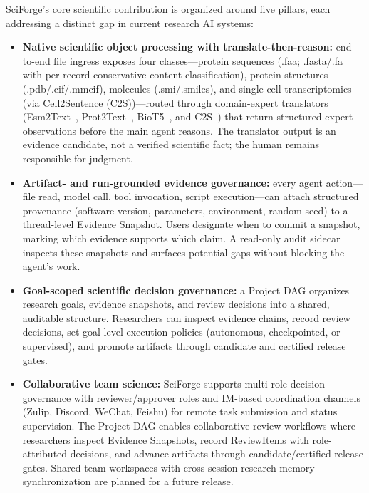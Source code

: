 \documentclass[sn-basic,Numbered,pdflatex]{sn-jnl}
\begin{document}
SciForge's core scientific contribution is organized around five pillars, each addressing a distinct gap in current research AI systems:
\begin{itemize}
    \item \textbf{Native scientific object processing with translate-then-reason:} end-to-end file ingress exposes four classes---protein sequences (.faa; .fasta/.fa with per-record conservative content classification), protein structures (.pdb/.cif/.mmcif), molecules (.smi/.smiles), and single-cell transcriptomics (via Cell2Sentence (C2S))---routed through domain-expert translators (Esm2Text~\cite{abdine2023prot2text}, Prot2Text~\cite{abdine2023prot2text}, BioT5~\cite{pei2024biot5}, and C2S~\cite{rizvi2025c2s}) that return structured expert observations before the main agent reasons. The translator output is an evidence candidate, not a verified scientific fact; the human remains responsible for judgment.

    \item \textbf{Artifact- and run-grounded evidence governance:} every agent action---file read, model call, tool invocation, script execution---can attach structured provenance (software version, parameters, environment, random seed) to a thread-level Evidence Snapshot. Users designate when to commit a snapshot, marking which evidence supports which claim. A read-only audit sidecar inspects these snapshots and surfaces potential gaps without blocking the agent's work.

    \item \textbf{Goal-scoped scientific decision governance:} a Project DAG organizes research goals, evidence snapshots, and review decisions into a shared, auditable structure. Researchers can inspect evidence chains, record review decisions, set goal-level execution policies (autonomous, checkpointed, or supervised), and promote artifacts through candidate and certified release gates.

    \item \textbf{Collaborative team science:} SciForge supports multi-role decision governance with reviewer/approver roles and IM-based coordination channels (Zulip, Discord, WeChat, Feishu) for remote task submission and status supervision. The Project DAG enables collaborative review workflows where researchers inspect Evidence Snapshots, record ReviewItems with role-attributed decisions, and advance artifacts through candidate/certified release gates. Shared team workspaces with cross-session research memory synchronization are planned for a future release.


\end{itemize}
\end{document}
